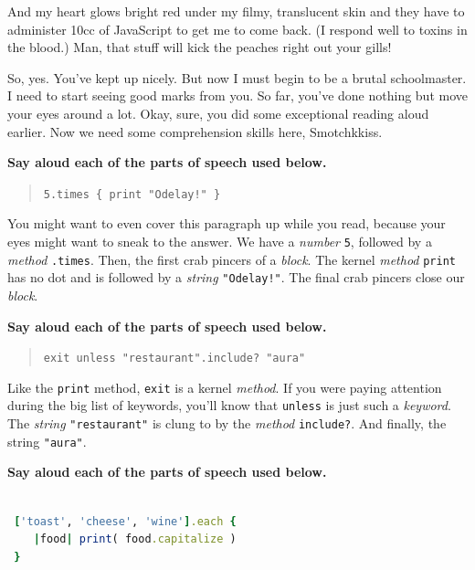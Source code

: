 \documentclass[10pt,twoside]{report}
\begin{document}
And my heart glows bright red under my filmy, translucent skin and
they have to administer 10cc of JavaScript to get me to come back.  (I
respond well to toxins in the blood.)  Man, that stuff will kick the
peaches right out your gills!

So, yes.  You've kept up nicely.  But now I must begin to be a brutal
schoolmaster. I need to start seeing good marks from you.  So far,
you've done nothing but move your eyes around a lot.  Okay, sure, you
did some exceptional reading aloud earlier.  Now we need some
comprehension skills here, Smotchkkiss.

{\bf Say aloud each of the parts of speech used below.}

\begin{quote}
\lstinline[breaklines=true]|5.times { print "Odelay!" }|\end{quote}


You might want to even cover this paragraph up while you read, because
your eyes might want to sneak to the answer.  We have a {\em number}
\lstinline[breaklines=true]|5|, followed by a {\em method}
\lstinline[breaklines=true]|.times|.  Then, the first crab pincers of
a {\em block}.  The kernel {\em method}
\lstinline[breaklines=true]|print| has no dot and is followed by a
          {\em string} \lstinline[breaklines=true]|"Odelay!"|.  The
          final crab pincers close our {\em block}.

{\bf Say aloud each of the parts of speech used below.}

\begin{quote}
\lstinline[breaklines=true]|exit unless "restaurant".include? "aura"|\end{quote}


Like the \lstinline[breaklines=true]|print| method,
\lstinline[breaklines=true]|exit| is a kernel {\em method}.  If you
were paying attention during the big list of keywords, you'll know
that \lstinline[breaklines=true]|unless| is just such a {\em keyword}.
The {\em string} \lstinline[breaklines=true]|"restaurant"| is clung to
by the {\em method} \lstinline[breaklines=true]|include?|.  And
finally, the string \lstinline[breaklines=true]|"aura"|.

{\bf Say aloud each of the parts of speech used below.}

\begin{lstlisting}[basicstyle=\ttfamily\color{basiccolor},
    commentstyle = \ttfamily\color{commentcolor},
    keywordstyle=\ttfamily\color{keywordscolor},
    stringstyle=\color{stringcolor},
    language=Ruby,
    basicstyle=\small\ttfamily,
    showstringspaces=false,
  ]

 ['toast', 'cheese', 'wine'].each { 
 	|food| print( food.capitalize ) 
 }

\end{lstlisting}
\end{document}
